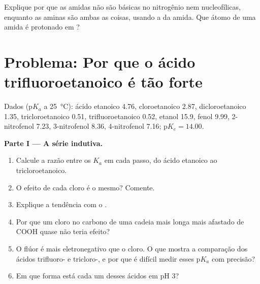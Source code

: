 \begin{exercise}[$\star\star\star$]\label{exo:b1:electronic-effects:12}
Explique por que as amidas não são básicas no nitrogênio nem
nucleofílicas, enquanto as aminas são ambas as coisas, usando a
 da amida. Que átomo de uma amida é protonado em
?
\end{exercise}

\section{Problema: Por que o ácido trifluoroetanoico é tão forte}

\begin{problem}
\label{pb:b1:electronic-effects:1}
Dados ($\mathrm{p}K_a$ a \qty{25}{\celsius}): ácido etanoico 4.76,
cloroetanoico 2.87, dicloroetanoico 1.35, tricloroetanoico 0.51,
trifluoroetanoico 0.52, etanol 15.9, fenol 9.99, 2-nitrofenol 7.23,
3-nitrofenol 8.36, 4-nitrofenol 7.16; $\mathrm{p}K_e = 14.00$.

\medskip
\noindent\textbf{Parte I --- A série indutiva.}
\begin{enumerate}
  \item Calcule a razão entre os $K_a$ em cada passo, do ácido etanoico
        ao tricloroetanoico.
  \item O efeito de cada cloro é o mesmo? Comente.
  \item Explique a tendência com o .
  \item Por que um cloro no carbono de uma cadeia mais longa mais
        afastado de COOH quase não teria efeito?
  \item O flúor é mais eletronegativo que o cloro. O que mostra a
        comparação dos ácidos trifluoro- e tricloro-, e por que é difícil
        medir esses $\mathrm{p}K_a$ com precisão?
  \item Em que forma está cada um desses ácidos em pH 3?
\end{enumerate}


\end{problem}
